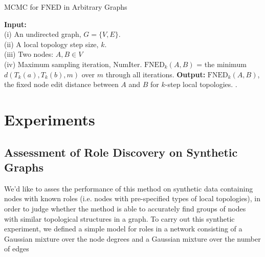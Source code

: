 \documentclass{article}
\begin{document}
\begin{algorithm}[h!tbp]
\caption{MCMC for FNED in Arbitrary Graphs}
\label{alg:fnedMcmc}
\begin{algorithmic}[1]
\STATE \textbf{Input:} \\(i) An undirected graph, $G = \{V,E\}$.\\(ii) A local topology step size, $k$.\\(iii) Two nodes: $A, B \in V$\\(iv) Maximum sampling iteration, NumIter.
\ELSE
{}
\ENDIF
\ENDIF
\ENDFOR
\STATE $\text{FNED}_{k}(A,B)$ = the minimum $d(T_{k}(a), T_{k}(b), m)$ over $m$ through all iterations.
\STATE \textbf{Output:} $\text{FNED}_{k}(A,B)$, the fixed node edit distance between $A$ and $B$ for $k$-step local topologies.
.
\end{algorithmic}
\end{algorithm}


\section{Experiments}
\label{sec:exp}



\subsection{Assessment of Role Discovery on Synthetic Graphs}
We'd like to asses the performance of this method on synthetic data containing nodes with known roles (i.e. nodes with pre-specified types of local topologies), in order to judge whether the method is able to accurately find groups of nodes with similar topological structures in a graph. To carry out this synthetic experiment, we defined a simple model for roles in a network consisting of a Gaussian mixture over the node degrees and a Gaussian mixture over the number of edges 
\end{document}
